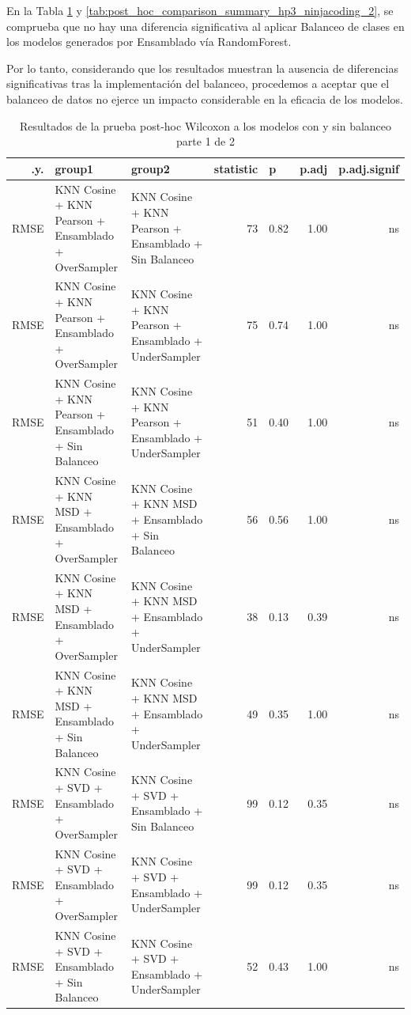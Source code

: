 En la Tabla \ref{tab:post_hoc_comparison_summary_hp3_ninjacoding_1} y \ref{tab:post_hoc_comparison_summary_hp3_ninjacoding_2}, se comprueba que no hay una diferencia significativa al aplicar Balanceo de clases en los modelos generados por Ensamblado vía RandomForest.

Por lo tanto, considerando que los resultados muestran la ausencia de diferencias significativas tras la implementación del balanceo, procedemos a aceptar que el balanceo de datos no ejerce un impacto considerable en la eficacia de los modelos.

\begin{table}[H]
\caption{Resultados de la prueba post-hoc Wilcoxon a los modelos con y sin balanceo parte 1 de 2}
\label{tab:post_hoc_comparison_summary_hp3_ninjacoding_1}
    \centering
    \begin{tabular}{rp{4cm}p{4cm}rlrr} 
    \hline
        .y. & group1 & group2 & statistic & p & p.adj & p.adj.signif \\ \hline
        RMSE & KNN Cosine + KNN Pearson + Ensamblado + OverSampler & KNN Cosine + KNN Pearson + Ensamblado + Sin Balanceo & 73 & 0.82 & 1.00 & ns \\ \hline
        RMSE & KNN Cosine + KNN Pearson + Ensamblado + OverSampler & KNN Cosine + KNN Pearson + Ensamblado + UnderSampler & 75 & 0.74 & 1.00 & ns \\ \hline
        RMSE & KNN Cosine + KNN Pearson + Ensamblado + Sin Balanceo & KNN Cosine + KNN Pearson + Ensamblado + UnderSampler & 51 & 0.40 & 1.00 & ns \\ \hline
        RMSE & KNN Cosine + KNN MSD + Ensamblado + OverSampler & KNN Cosine + KNN MSD + Ensamblado + Sin Balanceo & 56 & 0.56 & 1.00 & ns \\ \hline
        RMSE & KNN Cosine + KNN MSD + Ensamblado + OverSampler & KNN Cosine + KNN MSD + Ensamblado + UnderSampler & 38 & 0.13 & 0.39 & ns \\ \hline
        RMSE & KNN Cosine + KNN MSD + Ensamblado + Sin Balanceo & KNN Cosine + KNN MSD + Ensamblado + UnderSampler & 49 & 0.35 & 1.00 & ns \\ \hline
        RMSE & KNN Cosine + SVD + Ensamblado + OverSampler & KNN Cosine + SVD + Ensamblado + Sin Balanceo & 99 & 0.12 & 0.35 & ns \\ \hline
        RMSE & KNN Cosine + SVD + Ensamblado + OverSampler & KNN Cosine + SVD + Ensamblado + UnderSampler & 99 & 0.12 & 0.35 & ns \\ \hline
        RMSE & KNN Cosine + SVD + Ensamblado + Sin Balanceo & KNN Cosine + SVD + Ensamblado + UnderSampler & 52 & 0.43 & 1.00 & ns \\ \hline

\end{tabular}
\end{table}
